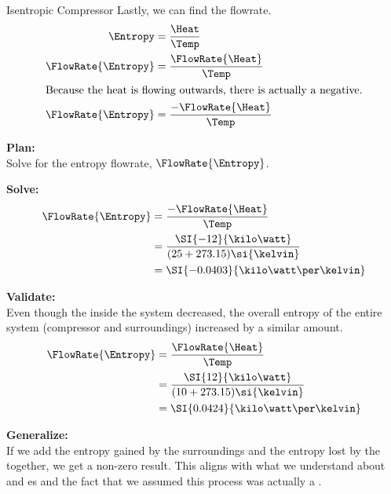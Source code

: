 \begin{example}{Isentropic Compressor}
  Lastly, we can find the  flowrate.
  \begin{align*}
    \Entropy &= \frac{\Heat}{\Temp} \\
    \FlowRate{\Entropy} &= \frac{\FlowRate{\Heat}}{\Temp} \\
    \intertext{Because the heat is flowing outwards, there is actually a negative.}
    \FlowRate{\Entropy} &= \frac{-\FlowRate{\Heat}}{\Temp}
  \end{align*}

  \textbf{Plan:} \\
  Solve for the entropy flowrate, $\FlowRate{\Entropy}$.

  \textbf{Solve:} \\
  \begin{align*}
    \FlowRate{\Entropy} &= \frac{-\FlowRate{\Heat}}{\Temp} \\
                        &= \frac{\SI{-12}{\kilo\watt}}{(25 + 273.15)\si{\kelvin}} \\
                        &= \SI{-0.0403}{\kilo\watt\per\kelvin}
  \end{align*}

  \textbf{Validate:} \\
  Even though the  inside the system decreased, the overall entropy of the entire system (compressor and surroundings) increased by a similar amount.
  \begin{align*}
    \FlowRate{\Entropy} &= \frac{\FlowRate{\Heat}}{\Temp} \\
                        &= \frac{\SI{12}{\kilo\watt}}{(10 + 273.15)\si{\kelvin}} \\
                        &= \SI{0.0424}{\kilo\watt\per\kelvin}
  \end{align*}

  \textbf{Generalize:} \\
  If we add the entropy gained by the surroundings and the entropy lost by the  together, we get a non-zero result.
  This aligns with what we understand about  and es and the fact that we assumed this process was actually a .
\end{example}

